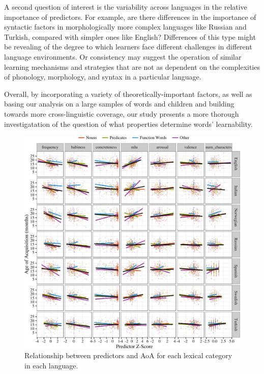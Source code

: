 \documentclass[10pt, letterpaper]{article}
\newenvironment{CodeChunk}{}{}
\begin{document}
A second question of interest is the variability across languages in the
relative importance of predictors. For example, are there differences in
the importance of syntactic factors in morphologically more complex
languages like Russian and Turkish, compared with simpler ones like
English? Differences of this type might be revealing of the degree to
which learners face different challenges in different language
environments. Or consistency may suggest the operation of similar
learning mechanisms and strategies that are not as dependent on the
complexities of phonology, morphology, and syntax in a particular
language.

Overall, by incorporating a variety of theoretically-important factors,
as well as basing our analysis on a large samples of words and children
and building towards more cross-linguistic coverage, our study presents
a more thorough investigatation of the question of what properties
determine words' learnability.

\begin{CodeChunk}
\begin{figure}[!h]

{\centering \includegraphics{figs/data-1} 

}

\caption[Relationship between predictors and AoA for each lexical category in each language]{Relationship between predictors and AoA for each lexical category in each language.}\label{fig:data}
\end{figure}
\end{CodeChunk}
\end{document}
